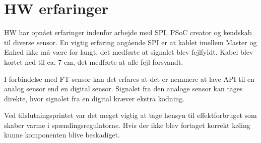 \section{HW erfaringer}

HW har opnået erfaringer indenfor arbejde med SPI, PSoC creator og kendskab til diverse sensor. En vigtig erfaring angående SPI er at kablet imellem Master og Enhed ikke må være for langt, det medførte at signalet blev fejlfyldt. Kabel blev kortet ned til ca. 7 cm, det medførte at alle fejl forsvandt.

I forbindelse med FT-sensor kan det erfares at det er nemmere at lave API til en analog sensor end en digital sensor. Signalet fra den analoge sensor kan tages direkte, hvor signalet fra en digital kræver ekstra kodning. 

Ved tilslutningsprintet var det meget vigtig at tage hensyn til effektforbruget som skaber varme i spændingsregulatorne. Hvis der ikke blev fortaget korrekt køling kunne komponenten blive beskadiget.  
